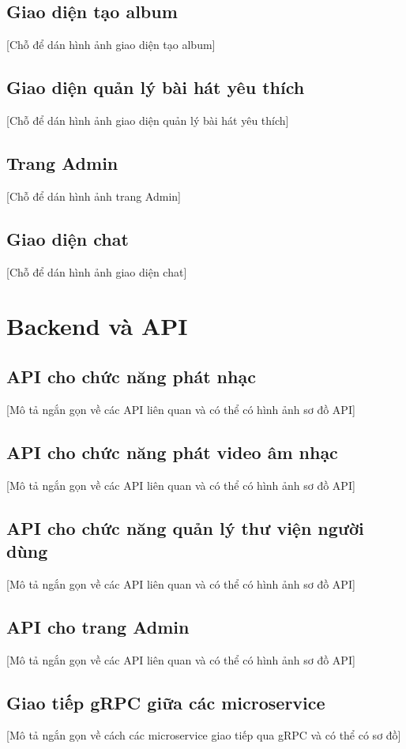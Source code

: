 \subsection{Giao diện tạo album}
\label{subsec:create_album_ui}
[Chỗ để dán hình ảnh giao diện tạo album]

\subsection{Giao diện quản lý bài hát yêu thích}
\label{subsec:favorite_songs_ui}
[Chỗ để dán hình ảnh giao diện quản lý bài hát yêu thích]

\subsection{Trang Admin}
\label{subsec:admin_ui}
[Chỗ để dán hình ảnh trang Admin]

\subsection{Giao diện chat}
\label{subsec:chat_ui}
[Chỗ để dán hình ảnh giao diện chat]

\section{Backend và API}
\label{sec:backend_implementation}

\subsection{API cho chức năng phát nhạc}
\label{subsec:music_api}
[Mô tả ngắn gọn về các API liên quan và có thể có hình ảnh sơ đồ API]

\subsection{API cho chức năng phát video âm nhạc}
\label{subsec:video_api}
[Mô tả ngắn gọn về các API liên quan và có thể có hình ảnh sơ đồ API]

\subsection{API cho chức năng quản lý thư viện người dùng}
\label{subsec:library_api}
[Mô tả ngắn gọn về các API liên quan và có thể có hình ảnh sơ đồ API]

\subsection{API cho trang Admin}
\label{subsec:admin_api}
[Mô tả ngắn gọn về các API liên quan và có thể có hình ảnh sơ đồ API]

\subsection{Giao tiếp gRPC giữa các microservice}
\label{subsec:grpc_communication}
[Mô tả ngắn gọn về cách các microservice giao tiếp qua gRPC và có thể có sơ đồ]